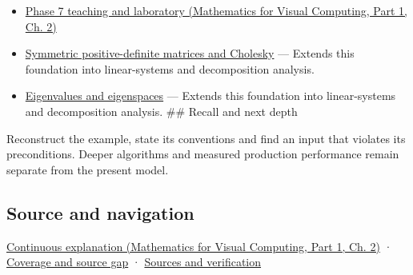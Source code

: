 \hypertarget{appendix-175ca5ff874d-used-by}{}

\begin{itemize}
\tightlist
\item
  \href{../02-Mathematics-for-Visual-Computing-P01/main.pdf\#01-foundations-i-ch018-keep-the-promises-visible-while-moving-between-representations}{Phase 7 teaching and laboratory (Mathematics for Visual Computing, Part 1, Ch. 2)}
\item
  \hyperref[appendix-50d2ea3c9b26]{Symmetric positive-definite matrices and Cholesky} --- Extends this foundation into linear-systems and decomposition analysis.
\item
  \hyperref[appendix-0b3be18411f9]{Eigenvalues and eigenspaces} --- Extends this foundation into linear-systems and decomposition analysis. \#\# Recall and next depth
\end{itemize}

Reconstruct the example, state its conventions and find an input that violates its preconditions. Deeper algorithms and measured production performance remain separate from the present model.

\subsection{Source and navigation}\label{appendix-175ca5ff874d-source-and-navigation}

\hypertarget{appendix-175ca5ff874d-source-and-navigation}{}

\href{../02-Mathematics-for-Visual-Computing-P01/main.pdf\#01-foundations-i-ch018-keep-the-promises-visible-while-moving-between-representations}{Continuous explanation (Mathematics for Visual Computing, Part 1, Ch. 2)} · \hyperref[appendix-fd090d982a15-phase-7---parts-601-700]{Coverage and source gap} · \hyperref[appendix-a103e7846d21-phase-7---source-analysis-and-verification]{Sources and verification}
